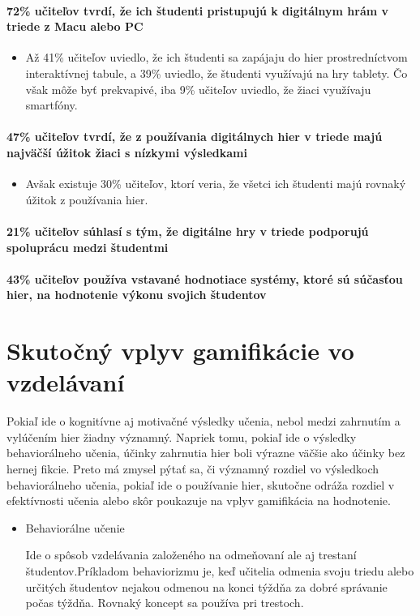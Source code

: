 \documentclass[10pt,twoside,slovak,a4paper]{article}
\begin{document}
\paragraph{72\% učiteľov tvrdí, že ich študenti pristupujú k digitálnym hrám v triede z Macu alebo PC\cite{games}}
    \begin{itemize}
        \item Až 41\% učiteľov uviedlo, že ich študenti sa zapájaju do hier prostredníctvom interaktívnej tabule, a 39\% uviedlo, že študenti využívajú na hry tablety. Čo však môže byť prekvapivé, iba 9\% učiteľov uviedlo, že žiaci využívaju smartfóny.
    \end{itemize}
\paragraph{47\% učiteľov tvrdí, že z používania digitálnych hier v triede majú najväčší úžitok žiaci s nízkymi výsledkami\cite{games}}
    \begin{itemize}
        \item Avšak existuje 30\% učiteľov, ktorí veria, že všetci ich študenti majú rovnaký úžitok z používania hier. 
    \end{itemize}
\paragraph{21\% učiteľov súhlasí s tým, že digitálne hry v triede podporujú spoluprácu medzi študentmi\cite{games}}   
\paragraph{43\% učiteľov používa vstavané hodnotiace systémy, ktoré sú súčasťou hier, na hodnotenie výkonu svojich študentov\cite{games}}

\section{Skutočný vplyv gamifikácie vo vzdelávaní} 
Pokiaľ ide o kognitívne aj motivačné výsledky učenia, nebol medzi zahrnutím a vylúčením hier žiadny významný. Napriek tomu, pokiaľ ide o výsledky behaviorálneho učenia, účinky zahrnutia hier boli výrazne väčšie ako účinky bez hernej fikcie. Preto má zmysel pýtať sa, či významný rozdiel vo výsledkoch behaviorálneho učenia, pokiaľ ide o používanie hier, skutočne odráža rozdiel v efektívnosti učenia alebo skôr poukazuje na vplyv gamifikácia na hodnotenie.

\begin{itemize}
    \item Behaviorálne učenie

Ide o spôsob vzdelávania založeného na odmeňovaní ale aj trestaní študentov.Príkladom behaviorizmu je, keď učitelia odmenia svoju triedu alebo určitých študentov nejakou odmenou na konci týždňa za dobré správanie počas týždňa. Rovnaký koncept sa používa pri trestoch.
\end{itemize}
\end{document}
